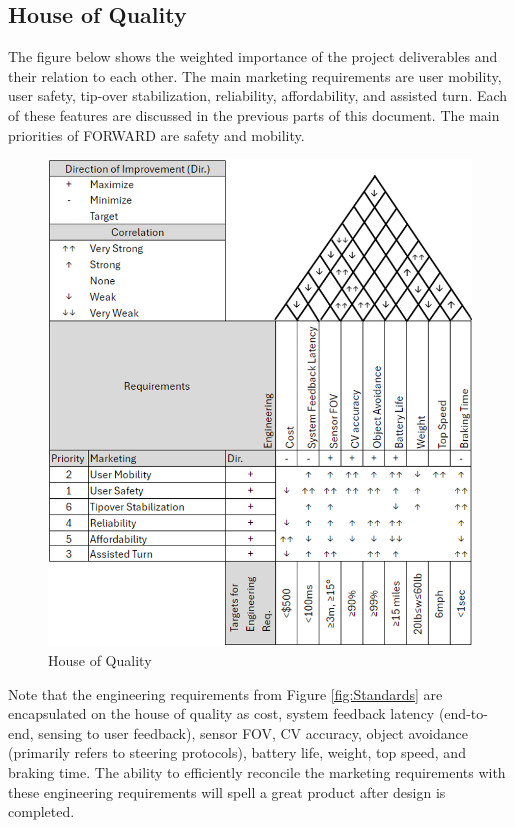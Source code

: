 \subsection{House of Quality}
\indent The figure below shows the weighted importance of the project deliverables and their relation to each other. The main marketing requirements are user mobility, user safety, tip-over stabilization, reliability, affordability, and assisted turn. Each of these features are discussed in the previous parts of this document. The main priorities of FORWARD are safety and mobility. 
\\

\begin{figure}[H]
	\centering
	\includegraphics[width=\textwidth]{./Images/HoQ.png}
	\caption{\label{fig:HoQ}House of Quality}
\end{figure}


\noindent
Note that the engineering requirements from Figure \ref{fig:Standards} are encapsulated on the house of quality as cost, system feedback latency (end-to-end, sensing to user feedback), sensor FOV, CV accuracy, object avoidance (primarily refers to steering protocols), battery life, weight, top speed, and braking time. The ability to efficiently reconcile the marketing requirements with these engineering requirements will spell a great product after design is completed. 

